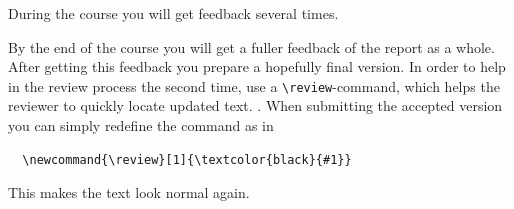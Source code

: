 During the course you will get feedback several times. 

By the end of the course you will get a fuller feedback of the report
as a whole. After getting this feedback you prepare a hopefully final
version. In order to help in the review process the second time, use a
\verb|\review|-command, which helps the reviewer to quickly locate
updated text. . When submitting the accepted version you can
simply redefine the command as in
\begin{verbatim}
  \newcommand{\review}[1]{\textcolor{black}{#1}}
\end{verbatim}
This makes the text look normal again.